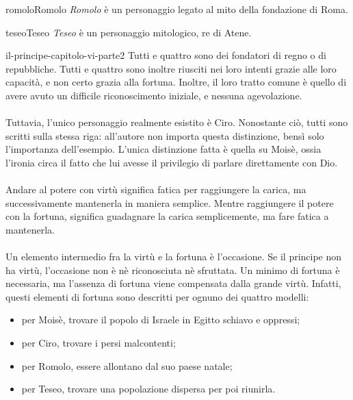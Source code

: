 \documentclass[preview]{standalone}
\begin{document}
\begin{snippetcharacter}{romolo}{Romolo}
    \textit{Romolo} è un personaggio legato al mito della fondazione di Roma.
\end{snippetcharacter}

\begin{snippetcharacter}{teseo}{Teseo}
    \textit{Teseo} è un personaggio mitologico, re di Atene.
\end{snippetcharacter}

\begin{snippet}{il-principe-capitolo-vi-parte2}
    Tutti e quattro sono dei fondatori di regno o di repubbliche.
    Tutti e quattro sono inoltre riusciti nei loro intenti grazie
    alle loro capacità, e non certo grazia alla fortuna.
    Inoltre, il loro tratto comune è quello di avere avuto un difficile riconoscimento iniziale,
    e nessuna agevolazione.
    \\\\
    Tuttavia, l'unico personaggio realmente esistito è Ciro.
    Nonostante ciò, tutti sono scritti sulla stessa riga: all'autore non importa
    questa distinzione, bensì solo l'importanza dell'esempio.
    L'unica distinzione fatta è quella su Moisè, ossia l'ironia circa il fatto che lui
    avesse il privilegio di parlare direttamente con Dio. 
    \\\\
    Andare al potere con virtù significa fatica per raggiungere la carica,
    ma successivamente mantenerla in maniera semplice.
    Mentre raggiungere il potere con la fortuna, significa guadagnare la carica semplicemente,
    ma fare fatica a mantenerla.
    \\\\
    Un elemento intermedio fra la virtù e la fortuna è l'occasione.
    Se il principe non ha virtù, l'occasione non è nè riconosciuta nè sfruttata.
    Un minimo di fortuna è necessaria, ma l'assenza di fortuna viene compensata dalla grande virtù.
    Infatti, questi elementi di fortuna sono descritti per ognuno dei quattro modelli:
    \begin{itemize}
        \item per Moisè, trovare il popolo di Israele in Egitto schiavo e oppressi;
        \item per Ciro, trovare i persi malcontenti;
        \item per Romolo, essere allontano dal suo paese natale;
        \item per Teseo, trovare una popolazione dispersa per poi riunirla.
    \end{itemize}


\end{snippet}
\end{document}
